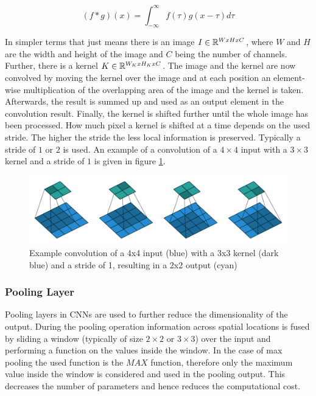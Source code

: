 \begin{equation}
    (f * g)(x) = \int_{-\infty}^{\infty}f(\tau)g(x - \tau)d\tau
    \label{eq:conv}
\end{equation}

In simpler terms that just means there is an image $I \in \mathbb{R}^{WxHxC}$, where $W$ and $H$ are the width and height of the image and $C$ being the number of channels.
Further, there is a kernel $K \in \mathbb{R}^{W_KxH_KxC}$.
The image and the kernel are now convolved by moving the kernel over the image and at each position an element-wise multiplication of the overlapping area of the image and the kernel is taken.
Afterwards, the result is summed up and used as an output element in the convolution result.
Finally, the kernel is shifted further until the whole image has been processed.
How much pixel a kernel is shifted at a time depends on the used stride.
The higher the stride the less local information is preserved.
Typically a stride of $1$ or $2$ is used.
An example of a convolution of a $4\times4$ input with a $3\times3$ kernel and a stride of $1$ is given in figure \ref{fig:conv_example}.

\begin{figure}
\begin{center}
    \includegraphics[width=16cm]{imgs/conv_example_full.png}
    \caption{Example convolution of a 4x4 input (blue) with a 3x3 kernel (dark blue) and a stride of 1, resulting in a 2x2 output (cyan) \cite{conv_arithmetic}}
    \label{fig:conv_example}
\end{center}
\end{figure}

\subsubsection{Pooling Layer}
\label{sec:max_pooling}

Pooling layers in \acp{CNN} are used to further reduce the dimensionality of the output.
During the pooling operation information across spatial locations is fused by sliding a window (typically of size $2\times2$ or $3\times3$) over the input and performing a function on the values inside the window.
In the case of max pooling the used function is the $MAX$ function, therefore only the maximum value inside the window is considered and used in the pooling output.
This decreases the number of parameters and hence reduces the computational cost. \cite{dl}


